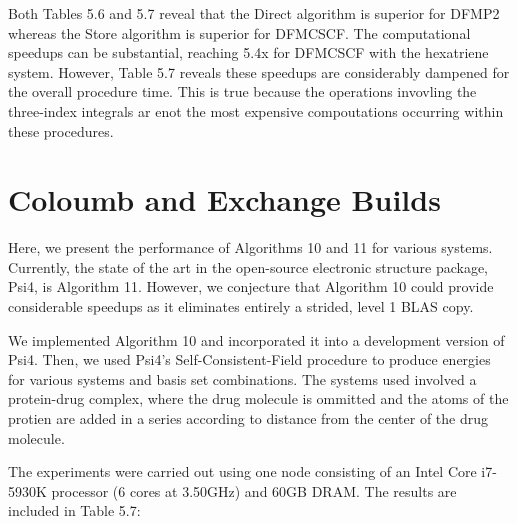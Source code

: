 Both Tables 5.6 and 5.7 reveal that the Direct algorithm is superior for DFMP2 whereas the Store algorithm is superior for
DFMCSCF. The computational speedups can be substantial, reaching 5.4x for DFMCSCF with the hexatriene system. However, Table 5.7
reveals these speedups are considerably dampened for the overall procedure time. This is true because 
the operations invovling the three-index integrals ar enot the most expensive compoutations occurring within these procedures.


\section{Coloumb and Exchange Builds}

Here, we present the performance of Algorithms 10 and 11 for various systems. Currently, the state of the art in the 
open-source electronic structure package, Psi4, is Algorithm 11. However, we conjecture that Algorithm 10 could provide 
considerable speedups as it eliminates entirely a strided, level 1 BLAS copy.   

We implemented Algorithm 10 and incorporated it into a development version of Psi4. Then, we used Psi4's Self-Consistent-Field
procedure to produce energies for various systems and basis set combinations. The systems used involved a protein-drug complex,
where the drug molecule is ommitted and the atoms of the protien are added in a series according to distance from the center of
the drug molecule. 

The experiments were carried out using one node consisting of an Intel Core i7-5930K processor
(6 cores at 3.50GHz) and 60GB DRAM. The results are included in Table 5.7:


 
 

